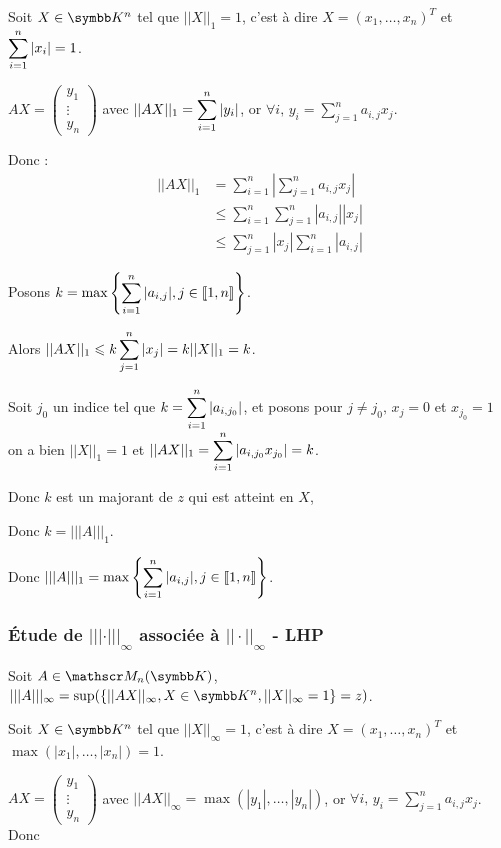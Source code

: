 Soit $X \in \K^n$ tel que $||X||_1 = 1$, c'est à dire $X = (x_1, \ldots, x_n)^T$ et $\displaystyle \sum_{i=1}^n |x_i| = 1$.

$AX = \begin{pmatrix}
    y_1 \\
    \vdots \\
    y_n
\end{pmatrix}$  avec $\displaystyle ||AX||_1 = \sum_{i=1}^n |y_i|$, 
or $\displaystyle \forall i, \, y_i = \sum_{j=1}^n a_{i, j} x_j$. 

Donc :
\begin{align*}
    || AX ||_1 & = \sum_{i=1}^n \left| \sum_{j=1}^n a_{i, j} x_j \right| \\
    & \leqslant \sum_{i=1}^n \sum_{j=1}^n |a_{i, j}| |x_j| \\
    & \leqslant \sum_{j=1}^n |x_j| \sum_{i=1}^n |a_{i, j}| 
\end{align*}

Posons $\displaystyle k = \max \left\{ \sum_{i=1}^n |a_{i, j}|, j \in [\![1, n]\!] \right\}$.

Alors $\displaystyle ||AX||_1 \leqslant k \sum_{j=1}^n |x_j| = k ||X||_1 = k$.


Soit $j_0$ un indice tel que $\displaystyle k = \sum_{i=1}^n |a_{i, j_0}|$, et posons pour 
$j \neq j_0, \, x_j = 0$ et $x_{j_0} = 1$ on a bien $||X||_1 = 1$ et
$\displaystyle ||AX||_1 = \sum_{i=1}^n |a_{i, j_0} x_{j_0}| = k$.

Donc $k$ est un majorant de $z$ qui est atteint en $X$,

Donc $k = |||A|||_1$.

Donc $\displaystyle |||A|||_1 = \max \left\{ \sum_{i=1}^n |a_{i, j}|, j \in [\![1, n]\!] \right\}$.

\subsubsection{Étude de $||| \cdot |||_\infty$ associée à $|| \cdot ||_\infty$ - LHP}
Soit $A \in \mathscr M_n(\K)$, $|||A|||_\infty = \sup (\{ ||AX||_\infty, X \in \K^n, ||X||_\infty = 1 \} = z) $.

Soit $X \in \K^n$ tel que $||X||_\infty = 1$, c'est à dire $X = (x_1, \ldots, x_n)^T$ et $\max(|x_1|, \ldots, |x_n|) = 1$.

$AX = \begin{pmatrix}
    y_1 \\
    \vdots \\
    y_n
\end{pmatrix}$  avec $||AX||_\infty = \max(|y_1|, \ldots, |y_n|)$, 
or $\displaystyle \forall i, \, y_i = \sum_{j=1}^n a_{i, j} x_j$. Donc 

